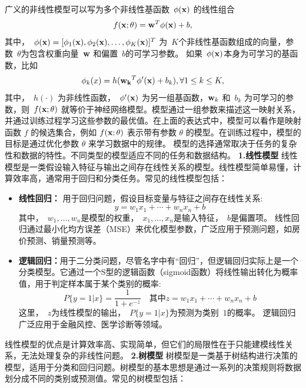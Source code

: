 广义的非线性模型可以写为多个非线性基函数~$\phi({\bf x})$ 的线性组合
\begin{equation*}\label{ref}
f({\bf x}; \theta) = {\bf w}^T {\bf \phi}({\bf x}) + b,
\end{equation*}
其中，~$\phi({\bf x}) = [ \phi_1({\bf x}),\phi_2({\bf x}),\dots ,\phi_K({\bf x})]^T$ 为~$K$个非线性基函数组成的向量，参数~$\theta$为包含权重向量~${\bf w}$ 和偏置~$b$的可学习参数。
如果~$\phi({\bf x})$本身为可学习的基函数，比如
\begin{equation*}
\phi_k(x) = h({\bf w_k}^T\phi^\prime({\bf x}) + b _k), \forall 1 \le  k \le K,
\end{equation*}
其中，~$h(\cdot)$ 为非线性函数，~$\phi^\prime ({\bf x})$ 为另一组基函数，${\bf w}_k$ 和~$b_k$ 为可学习的参数，则~$f ({\bf x};\theta)$ 就等价于神经网络模型。模型通过一组参数来描述这一映射关系，并通过训练过程学习这些参数的最优值。在上面的表达式中，模型可以看作是映射函数 $f$ 的候选集合，例如 $f ({\bf x};\theta)$ 表示带有参数 $\theta$ 的模型。在训练过程中，模型的目标是通过优化参数 $\theta$ 来学习数据中的规律。
模型的选择通常取决于任务的复杂性和数据的特性。不同类型的模型适应不同的任务和数据结构。
{\bf 1.线性模型}
线性模型是一类假设输入特征与输出之间存在线性关系的模型。线性模型简单易懂，计算效率高，通常用于回归和分类任务。常见的线性模型包括：
\begin{itemize}
\item {\bf 线性回归：} 用于回归问题，假设目标变量与特征之间存在线性关系:
$$
y =w_1x_1+\cdots+ w_nx_n+b
$$
其中，~$w_1,\dots, w_n$是模型的权重，~$x_1,\dots,x_n$是输入特征，~$b$是偏置项。
线性回归通过最小化均方误差（MSE）来优化模型参数，广泛应用于预测问题，如房价预测、销量预测等。
\item  {\bf 逻辑回归：}用于二分类问题，尽管名字中有“回归”，但逻辑回归实际上是一个分类模型。它通过一个S型的逻辑函数（sigmoid函数）将线性输出转化为概率值，用于判定样本属于某个类别的概率:
$$
P\{ y=1 |x\} = \frac{1}{1+e^{-z}} \quad \mbox{其中} z =w_1x_1+\cdots+ w_nx_n+b
$$
这里，~$z$为线性模型的输出，~$P\{ y=1 |x\} $为预测为类别~$1$的概率。
逻辑回归广泛应用于金融风控、医学诊断等领域。
\end{itemize}
线性模型的优点是计算效率高、实现简单，但它们的局限性在于只能建模线性关系，无法处理复杂的非线性问题。
{\bf 2.树模型}
树模型是一类基于树结构进行决策的模型，适用于分类和回归问题。树模型的基本思想是通过一系列的决策规则将数据划分成不同的类别或预测值。常见的树模型包括：
